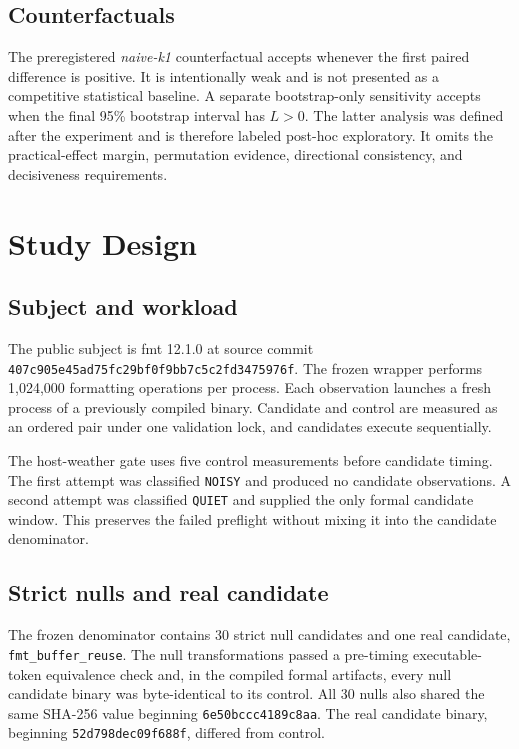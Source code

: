 \documentclass[10pt]{article}
\newcommand{\NullCount}{30}
\begin{document}
\subsection{Counterfactuals}

The preregistered \emph{naive-k1} counterfactual accepts whenever the first
paired difference is positive.  It is intentionally weak and is not presented
as a competitive statistical baseline.  A separate bootstrap-only sensitivity
accepts when the final 95\% bootstrap interval has $L>0$.  The latter analysis
was defined after the experiment and is therefore labeled post-hoc
exploratory.  It omits the practical-effect margin, permutation evidence,
directional consistency, and decisiveness requirements.

\section{Study Design}

\subsection{Subject and workload}

The public subject is fmt 12.1.0 at source commit
\texttt{407c905e45ad75fc29bf0f9bb7c5c2fd3475976f}.  The frozen wrapper performs
1,024,000 formatting operations per process.  Each observation launches a
fresh process of a previously compiled binary.  Candidate and control are
measured as an ordered pair under one validation lock, and candidates execute
sequentially.

The host-weather gate uses five control measurements before candidate timing.
The first attempt was classified \texttt{NOISY} and produced no candidate
observations.  A second attempt was classified \texttt{QUIET} and supplied the
only formal candidate window.  This preserves the failed preflight without
mixing it into the candidate denominator.

\subsection{Strict nulls and real candidate}

The frozen denominator contains \NullCount{} strict null candidates and one
real candidate, \texttt{fmt\_buffer\_reuse}.  The null transformations passed a
pre-timing executable-token equivalence check and, in the compiled formal
artifacts, every null candidate binary was byte-identical to its control.  All
30 nulls also shared the same SHA-256 value beginning
\texttt{6e50bccc4189c8aa}.  The real candidate binary, beginning
\texttt{52d798dec09f688f}, differed from control.
\end{document}
